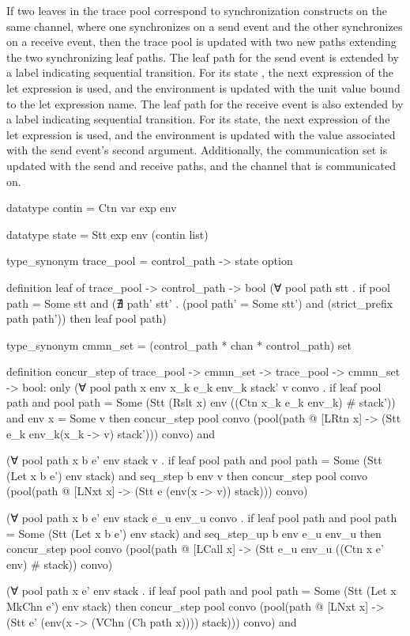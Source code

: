 If two leaves in the trace pool correspond to synchronization constructs on the same channel,
where one synchronizes on a send event and the other synchronizes on a receive event, then the
trace pool is updated with two new paths extending the two synchronizing leaf paths.  The leaf
path for the send event is extended by a label indicating sequential transition.  For its state
, the next expression of the let expression is used, and the environment is updated with the
unit value bound to the let expression name.  The leaf path for the receive event is also
extended by a label indicating sequential transition.  For its state, the next expression of
the let expression is used, and the environment is updated with the value associated with the
send event's second argument.   Additionally, the communication set is updated with the send
and receive paths, and the channel that is communicated on. 

datatype contin =
  Ctn var exp env

datatype state =
  Stt exp env (contin list)

type_synonym trace_pool =
  control_path -> state option

definition leaf of trace_pool -> control_path -> bool
(∀ pool path stt .
  if
    pool path = Some stt and 
    (∄ path' stt' . (pool path' = Some stt') and (strict_prefix path path'))
  then
    leaf pool path)

type_synonym cmmn_set =
  (control_path * chan * control_path) set


definition concur_step of trace_pool -> cmmn_set -> trace_pool -> cmmn_set -> bool: 
only
(∀ pool path x env x_k e_k env_k stack' v convo .
  if
    leaf pool path and
    pool path = Some (Stt (Rslt x) env ((Ctn x_k e_k env_k) # stack')) and
    env x = Some v
  then
    concur_step
      pool convo
      (pool(path @ [LRtn x] -> (Stt e_k env_k(x_k -> v) stack'))) convo) and

(∀ pool path x b e' env stack v .
  if 
    leaf pool path and
    pool path = Some (Stt (Let x b e') env stack) and
    seq_step b env v
  then
    concur_step pool convo (pool(path @ [LNxt x] -> (Stt e (env(x -> v)) stack))) convo)

(∀ pool path x b e' env stack e_u env_u convo .
  if 
    leaf pool path and 
    pool path = Some (Stt (Let x b e') env stack) and
    seq_step_up b env e_u env_u
  then
    concur_step
      pool convo
      (pool(path @ [LCall x] -> (Stt e_u env_u ((Ctn x e' env) # stack)) convo)

(∀ pool path x e' env stack .
  if 
    leaf pool path and
    pool path = Some (Stt (Let x MkChn e') env stack)
  then
    concur_step
      pool convo 
      (pool(path @ [LNxt x] -> (Stt e' (env(x -> (VChn (Ch path x)))) stack))) convo) and

